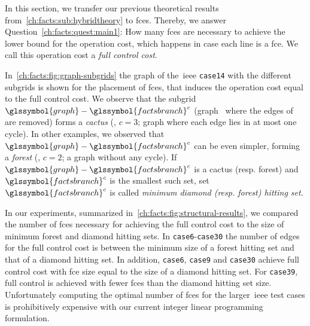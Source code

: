 % 
In this section, we transfer our previous theoretical
results from~\cref{ch:facts:sub:hybridtheory} to \gls{fce}s. Thereby, we answer
Question~\ref{ch:facts:quest:main1}: How many \gls{fce}s are necessary to
achieve the lower bound for the operation cost, which happens in case each line
is a \gls{fce}. We call this operation cost a \emph{full control cost}.

In~\cref{ch:facts:fig:graph-subgrids} the graph of the~\gls{ieee}
\texttt{case14} with the different subgrids is shown for the placement of
\gls{fce}s, that induces the operation cost equal to the full control cost. We
observe that the subgrid~$\glssymbol{graph}-\glssymbol{factsbranch}^c$
(graph~ where the edges of~ are removed)
forms a \emph{cactus} (\ie, $c = 3$; graph where each edge lies in at most one
cycle). In other examples, we observed
that~$\glssymbol{graph}-\glssymbol{factsbranch}^c$ can be even simpler, forming
a \emph{forest} (\ie, $c = 2$; a graph without any cycle). If
$\glssymbol{graph}-\glssymbol{factsbranch}^c$ is a cactus (resp. forest)
and~$\glssymbol{factsbranch}^c$ is the smallest such set,
set~$\glssymbol{factsbranch}^c$ is called \emph{minimum diamond \emph{(resp.}
forest\emph{)} hitting set}.

In our experiments, summarized in~\cref{ch:facts:fig:structural-results}, we
compared the number of \gls{fce}s necessary for achieving the full control cost
to the size of minimum forest and diamond hitting sets. In
\texttt{case6}-\texttt{case30} the number of edges for the full control cost is
between the minimum size of a forest hitting set and that of a diamond hitting
set. In addition, \texttt{case6}, \texttt{case9} and \texttt{case30} achieve
full control cost with \gls{fce} size equal to the size of a diamond hitting
set. For \texttt{case39}, full control is achieved with fewer \gls{fce}s than
the diamond hitting set size. Unfortunately computing the optimal number of
\gls{fce}s for the larger~\gls{ieee} test cases is prohibitively
expensive with our current integer linear programming formulation.

